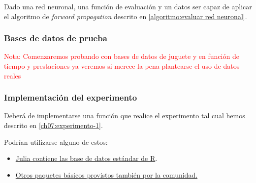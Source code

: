 Dado una red neuronal, una función de evaluación y un datos ser capaz de aplicar el algoritmo de \textit{forward propagation} descrito en \ref{algoritmo:evaluar red neuronal}.


\subsubsection{Bases de datos de prueba}
\textcolor{red}{Nota:
Comenzaremos probando con bases de datos de juguete 
y en función de tiempo y prestaciones ya veremos si merece la pena plantearse el uso de datos reales
}

\subsubsection{Implementación del experimento} 
Deberá de implementarse una función que realice el 
experimento tal cual hemos descrito en \ref{ch07:experimento-1}.

Podrían utilizarse alguno de estos: 

\begin{itemize}
    \item \href{https://github.com/JuliaStats/RDatasets.jl}{Julia contiene las base de datos estándar de R}.
    \item \href{https://juliaml.github.io/MLDatasets.jl/stable/}{Otros paquetes básicos provistos también por la comunidad.}
\end{itemize}
